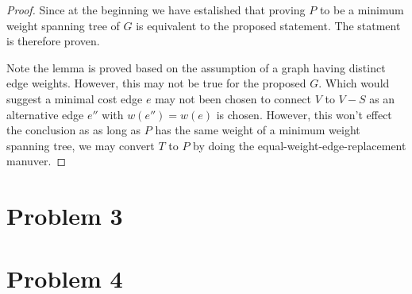 \documentclass[11pt]{article}
\begin{document}
\begin{proof}
Since at the beginning we have estalished that proving $P$ to be a minimum weight spanning tree of $G$ is equivalent to the proposed statement. The statment is therefore proven.\newline

Note the lemma is proved based on the assumption of a graph having distinct edge weights. However, this may not be true for the proposed $G$. Which would suggest a minimal cost edge $e$ may not been chosen to connect $V$ to $V-S$ as an alternative edge $e''$ with $w(e'') = w(e)$ is chosen. However, this won't effect the conclusion as as long as $P$ has the same weight of a minimum weight spanning tree, we may convert $T$ to $P$ by doing the equal-weight-edge-replacement manuver.

\end{proof}

\section*{Problem 3}



\section*{Problem 4}



%
% 
% 
\end{document}
